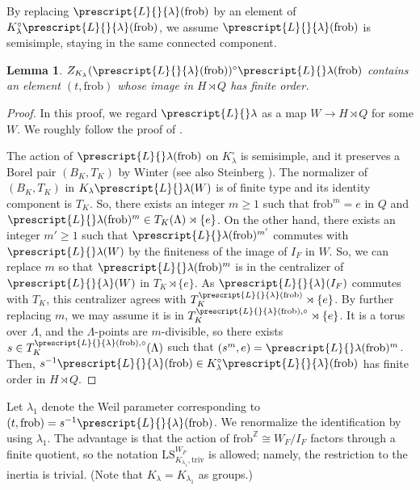 \documentclass{amsart}
\newtheorem{lemma}[theorem]{Lemma}
\theoremstyle{definition}
\theoremstyle{remark}
\numberwithin{equation}{section}
\newcommand{\Z}{\mathbb{Z}}
\newcommand{\co}[1]{\prescript{#1}{}}
\newcommand{\frob}{\mathrm{frob}}
\newcommand{\triv}{\mathrm{triv}}
\newcommand{\LS}{\mathrm{LS}}
\begin{document}
By replacing $\co{L}{\lambda}(\frob)$ by an element of $K_{\lambda}^{\circ} \co{L}{\lambda}(\frob)$, we assume $\co{L}{\lambda}(\frob)$ is semisimple, staying in the same connected component. 

\begin{lemma}{\label{lem: frobfiniteorder}}
$Z_{K_\lambda}(\co{L}{\lambda}(\frob))^\circ \co{L}\lambda(\frob)$ contains an element $(t, \frob)$ whose image in $H\rtimes Q$ has finite order.
\end{lemma}

\begin{proof}
In this proof, we regard $\co{L}\lambda$ as a map $W\to H\rtimes Q$ for some $W$. We roughly follow the proof of \cite[Theorem 3.6]{DHKM}. 

The action of $\co{L}\lambda (\frob)$ on $K_\lambda^\circ$ is semisimple, and it preserves a Borel pair $(B_K, T_K)$ by Winter \cite{Winter} (see also Steinberg \cite{SteinbergEnd}). The normalizer of $(B_K, T_K)$ in $K_\lambda \co{L}\lambda(W)$ is of finite type and its identity component is $T_K$. So, there exists an integer $m\geq 1$ such that $\frob^m=e$ in $Q$ and  $\co{L}\lambda (\frob)^m \in T_K(\Lambda) \rtimes \{e\}$. On the other hand, there exists an integer $m'\geq 1$ such that $\co{L}\lambda (\frob)^{m'}$ commutes with $\co{L}\lambda (W)$ by the finiteness of the image of $I_F$ in $W$. So, we can replace $m$ so that $\co{L}\lambda (\frob)^m$ is in the centralizer of $\co{L}{\lambda}(W)$  in $T_K \rtimes \{e\}$. As $\co{L}{\lambda}(I_F)$ commutes with $T_K$, this centralizer agrees with $T_K^{\co{L}{\lambda}(\frob)}  \rtimes \{e\}$. By further replacing $m$, we may assume it is in $T_K^{\co{L}{\lambda}(\frob), \circ} \rtimes \{e\}$. It is a torus over $\Lambda$, and the $\Lambda$-points are $m$-divisible, so there exists $s\in T_K^{\co{L}{\lambda}(\frob), \circ}(\Lambda)$ such that $(s^m, e)=\co{L}\lambda (\frob)^m$. Then, $s^{-1}\co{L}{\lambda}(\frob)\in K_\lambda^\circ \co{L}{\lambda}(\frob)$ has finite order in $H\rtimes Q$. 
\end{proof}

Let $\lambda_1$ denote the Weil parameter corresponding to $(t, \frob)=s^{-1}\co{L}{\lambda}(\frob)$. We renormalize the identification by using $\lambda_1$. The advantage is that the action of $\frob^\Z\cong W_F/I_F$ factors through a finite quotient, so the notation $\LS_{K_{\lambda_1}, \triv}^{W_F}$ is allowed; namely, the restriction to the inertia is trivial. (Note that $K_\lambda=K_{\lambda_1}$ as groups.)
\end{document}
